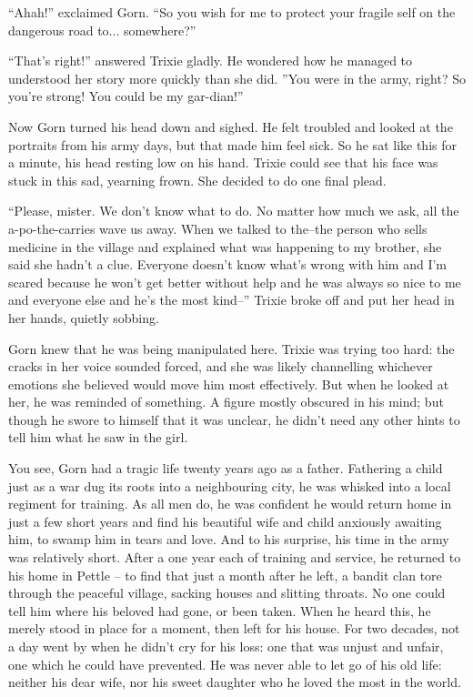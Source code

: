 ``Ahah!'' exclaimed Gorn. ``So you wish for me to protect your fragile self on
the dangerous road to... somewhere?''

``That's right!'' answered Trixie gladly. He wondered how he managed to
understood her story more quickly than she did. ''You were in the army, right?
So you're strong! You could be my gar-dian!''

Now Gorn turned his head down and sighed. He felt troubled and looked at the
portraits from his army days, but that made him feel sick. So he sat like this
for a minute, his head resting low on his hand. Trixie could see that his face
was stuck in this sad, yearning frown. She decided to do one final plead.

``Please, mister. We don't know what to do. No matter how much we ask, all the
a-po-the-carries wave us away. When we talked to the--the person who sells
medicine in the village and explained what was happening to my brother, she said
she hadn't a clue. Everyone doesn't know what's wrong with him and I'm scared
because he won't get better without help and he was always so nice to me and
everyone else and he's the most kind--'' Trixie broke off and put her head in
her hands, quietly sobbing.

Gorn knew that he was being manipulated here. Trixie was trying too hard: the
cracks in her voice sounded forced, and she was likely channelling whichever
emotions she believed would move him most effectively. But when he looked at
her, he was reminded of something. A figure mostly obscured in his mind; but
though he swore to himself that it was unclear, he didn't need any other hints
to tell him what he saw in the girl.

You see, Gorn had a tragic life twenty years ago as a father. Fathering a child
just as a war dug its roots into a neighbouring city, he was whisked into a
local regiment for training. As all men do, he was confident he would return
home in just a few short years and find his beautiful wife and child anxiously
awaiting him, to swamp him in tears and love. And to his surprise, his time in
the army was relatively short. After a one year each of training and service, he
returned to his home in Pettle -- to find that just a month after he left, a
bandit clan tore through the peaceful village, sacking houses and slitting
throats. No one could tell him where his beloved had gone, or been taken. When
he heard this, he merely stood in place for a moment, then left for his house.
For two decades, not a day went by when he didn't cry for his loss: one that was
unjust and unfair, one which he could have prevented. He was never able to let
go of his old life: neither his dear wife, nor his sweet daughter who he loved
the most in the world.

